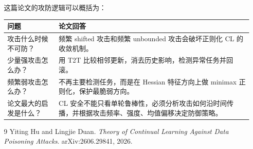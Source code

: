 \documentclass[UTF8,fontset=none,11pt]{ctexart}
\begin{document}
这篇论文的攻防逻辑可以概括为：

\begin{center}
\begin{tabular}{p{4.0cm}p{10.0cm}}
\toprule
问题 & 论文回答 \\
\midrule
攻击什么时候不可防？
& 频繁 shifted 攻击和频繁 unbounded 攻击会破坏正则化 CL 的收敛机制。\\
\addlinespace
少量强攻击怎么办？
& 用 T2T 比较相邻更新，消去历史影响，检测异常任务并回滚。\\
\addlinespace
频繁弱攻击怎么办？
& 不再主要检测任务，而是在 Hessian 特征方向上做 minimax 正则化，保护最脆弱方向。\\
\addlinespace
论文最大的启发是什么？
& CL 安全不能只看单轮鲁棒性，必须分析攻击如何沿时间传播，并根据攻击频率、强度、均值偏移决定防御策略。\\
\bottomrule
\end{tabular}
\end{center}

\begin{thebibliography}{9}
Yiting Hu and Lingjie Duan.
\newblock \emph{Theory of Continual Learning Against Data Poisoning Attacks}.
\newblock arXiv:2606.29841, 2026.
\end{thebibliography}
\end{document}
